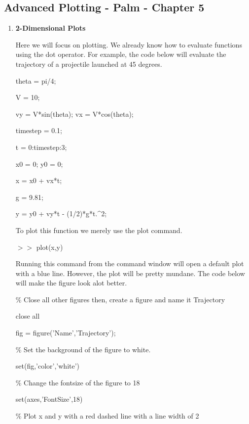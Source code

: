 \subsection{Advanced Plotting - Palm - Chapter 5}

\begin{enumerate}

\item {\bf 2-Dimensional Plots}

Here we will focus on plotting. We already know how to evaluate
functions using the dot operator. For example, the code below will
evaluate the trajectory of a projectile launched at 45 degrees.

\begin{framed}

theta = pi/4;

V = 10;

vy = V*sin(theta); vx = V*cos(theta);

timestep = 0.1;

t = 0:timestep:3;

x0 = 0; y0 = 0;

x = x0 + vx*t;

g = 9.81;

y = y0 + vy*t - (1/2)*g*t.\textrm{\^}2;

\end{framed}

To plot this function we merely use the plot command. 

$>>$ plot(x,y)

Running this command from the command window will open a default plot
with a blue line. However, the plot will be pretty mundane. The code
below will make the figure look alot better.

\begin{framed}

\textcolor{OliveGreen}{\% Close all other figures then, create a figure and name it Trajectory}

close all 

fig = figure('Name','Trajectory'); 

\textcolor{OliveGreen}{\% Set the background of the figure to white.}

set(fig,'color','white') 

\textcolor{OliveGreen}{\% Change the fontsize of the figure to 18}

set(axes,'FontSize',18) 

\textcolor{OliveGreen}{\% Plot x and y with a red dashed line with a line width of 2}


\end{framed}
\end{enumerate}
